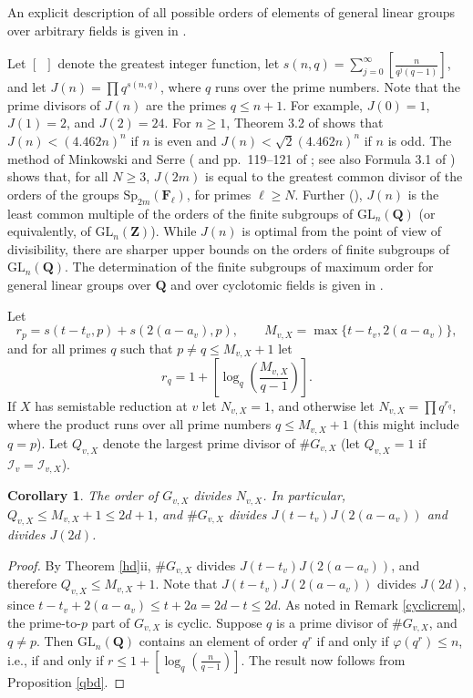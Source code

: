 \documentclass{amsart}
\def\Q{{\mathbf Q}}
\def\Z{{\mathbf Z}}
\def\F{{\mathbf F}}
\def\I{{\mathcal I}}
\def\II{{{\mathcal I}_{v,X}}}
\def\GL{\mathrm{GL}}
\def\Sp{\mathrm{Sp}}
\newtheorem{cor}[thm]{Corollary}
\theoremstyle{definition}
\begin{document}
An explicit description of all possible orders of elements of
general linear groups over arbitrary fields is given in 
\cite{Volvacev}.

Let $[\,\,\,]$ denote the greatest integer function,
let 
$s(n,q) = \sum_{j=0}^\infty \left[\frac{n}{q^j(q-1)}\right]$, 
and let 
$J(n) = \prod q^{s(n,q)}$, where $q$ runs over the prime numbers.
Note that the prime divisors of $J(n)$ are the primes 
$q \le n+1$.  
For example, $J(0) = 1$, $J(1) = 2$, and $J(2) = 24$.
For $n \ge 1$, Theorem 3.2 of \cite{JPAA} shows that
$J(n) < (4.462n)^{n}$ if $n$ is even and
$J(n) < \sqrt{2}(4.462n)^{n}$ if $n$ is odd.
The method of Minkowski and Serre (\cite{Mink} and pp.~119--121
of \cite{Serrearith}; see also Formula 3.1 of \cite{JPAA}) shows that,
for all $N \ge 3$, 
$J(2m)$ is equal to the greatest common divisor of the 
orders of the groups  $\Sp_{2m}(\F_{\ell})$, for primes $\ell \ge N$.
Further (\cite{SerreHarvard}), $J(n)$ is the least common multiple of 
the orders of the finite subgroups of $\GL_{n}(\Q)$ (or equivalently,
of $\GL_{n}(\Z)$).
While $J(n)$ is optimal from the point of view of divisibility,
there are sharper upper bounds on the orders of finite subgroups of
$\GL_{n}(\Q)$. 
The determination of the finite subgroups of maximum order for
general linear groups over $\Q$ and over cyclotomic fields is
given in \cite{Feit}.

Let
$$r_{p} = s(t-t_{v},p) + s(2(a-a_{v}),p), \qquad 
M_{v,X} = \max\{t-t_{v},2(a-a_{v})\},$$ and 
for all primes $q$ such that $p \ne q \le M_{v,X}+1$ let 
$$r_{q} = 1 + \left[\log_{q}\left(\frac{M_{v,X}}{q-1}\right)\right].$$
If $X$ has semistable reduction at $v$ let $N_{v,X} = 1$,
and otherwise let $N_{v,X} = \prod q^{r_{q}}$, where the
product runs over all prime numbers $q \le M_{v,X}+1$
(this might include $q=p$). 
Let $Q_{v,X}$ denote the largest prime divisor of 
$\#G_{v,X}$
(let $Q_{v,X} = 1$ if $\I_{v} = \II$).

\begin{cor}
\label{hdcor}
The order of $G_{v,X}$ divides $N_{v,X}$. In particular,
$Q_{v,X} \le M_{v,X} + 1 \le 2d + 1$, and 
$\#G_{v,X}$ divides 
$J(t-t_{v})J(2(a-a_{v}))$ and divides $J(2d)$. 
\end{cor}

\begin{proof}
By Theorem \ref{hd}ii,
 $\#G_{v,X}$ divides $J(t-t_{v})J(2(a-a_{v}))$,
and therefore $Q_{v,X} \le M_{v,X}+1$.
Note that $J(t-t_{v})J(2(a-a_{v}))$ divides $J(2d)$,
since 
$t - t_{v} + 2(a - a_{v}) \le t + 2a = 2d - t \le 2d$.
As noted in Remark \ref{cyclicrem}, the prime-to-$p$ part of 
$G_{v,X}$ is cyclic. 
Suppose $q$ is a prime divisor of $\#G_{v,X}$, and $q \ne p$.
Then $\GL_{n}(\Q)$ contains an element
of order $q^{r}$ if and only if $\varphi(q^{r}) \le n$, i.e.,
if and only if 
$r \le 1+\left[\log_{q}\left(\frac{n}{q-1}\right)\right]$.
The result now follows from Proposition \ref{qbd}.
\end{proof}
\end{document}
